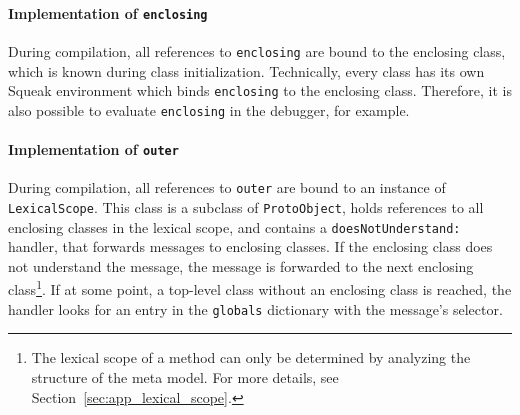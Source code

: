\paragraph{Implementation of \texttt{enclosing}}
During compilation, all references to \texttt{enclosing} are bound to the enclosing class, which is known during class initialization. Technically, every class has its own Squeak environment which binds \texttt{enclosing} to the enclosing class. Therefore, it is also possible to evaluate \texttt{enclosing} in the debugger, for example.

\paragraph{Implementation of \texttt{outer}}
During compilation, all references to \texttt{outer} are bound to an instance of \texttt{LexicalScope}. This class is a subclass of \texttt{ProtoObject}, holds references to all enclosing classes in the lexical scope, and contains a \texttt{doesNotUnderstand:} handler, that forwards messages to enclosing classes. If the enclosing class does not understand the message, the message is forwarded to the next enclosing class\footnote{The lexical scope of a method can only be determined by analyzing the structure of the meta model. For more details, see Section~\ref{sec:app_lexical_scope}.}. If at some point, a top-level class without an enclosing class is reached, the handler looks for an entry in the \texttt{globals} dictionary with the message's selector.

